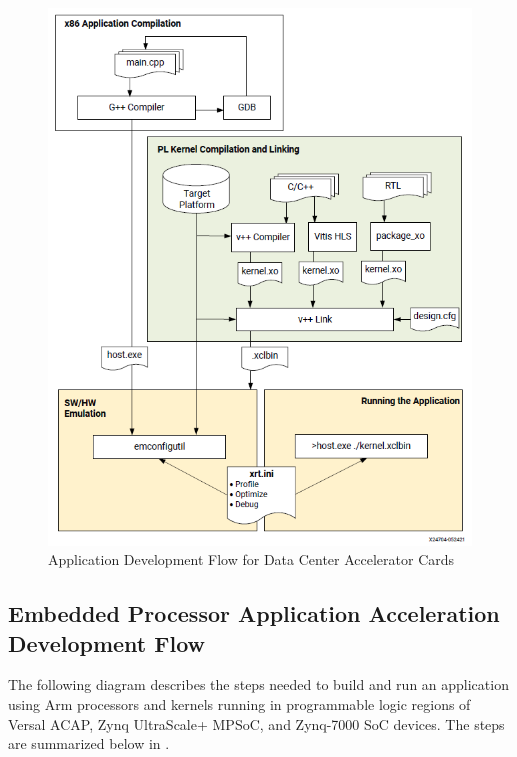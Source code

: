 \begin{figure}[H]
    \begin{center}
        \includegraphics[width=\textwidth]{images/DataCenterFlow.PNG}
        \caption{Application Development Flow for Data Center Accelerator Cards}
        \label{DataCenterFlow}
    \end{center}
\end{figure}

\clearpage

\subsection{Embedded Processor Application Acceleration Development Flow}
The following diagram describes the steps needed to build and run an application using Arm processors and kernels running in programmable logic regions of Versal ACAP, Zynq UltraScale+ MPSoC, and Zynq-7000 SoC devices. The steps are summarized below in .

